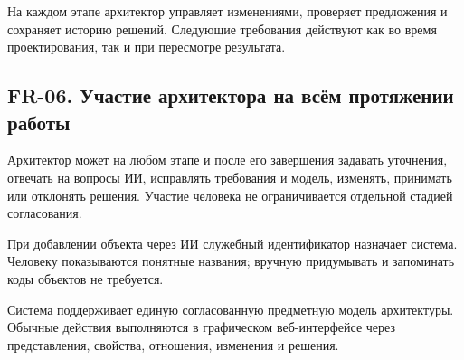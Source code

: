 \documentclass[10pt,a4paper]{article}
\begin{document}
На каждом этапе архитектор управляет изменениями, проверяет предложения и сохраняет историю решений. Следующие требования действуют как во время проектирования, так и при пересмотре результата.

\subsection{FR-06. Участие архитектора на всём протяжении работы}\label{fr-06-ux443ux447ux430ux441ux442ux438ux435-ux430ux440ux445ux438ux442ux435ux43aux442ux43eux440ux430-ux43dux430-ux432ux441ux451ux43c-ux43fux440ux43eux442ux44fux436ux435ux43dux438ux438-ux440ux430ux431ux43eux442ux44b}

Архитектор может на любом этапе и после его завершения задавать уточнения, отвечать на вопросы ИИ, исправлять требования и модель, изменять, принимать или отклонять решения. Участие человека не ограничивается отдельной стадией согласования.

При добавлении объекта через ИИ служебный идентификатор назначает система. Человеку показываются понятные названия; вручную придумывать и запоминать коды объектов не требуется.

Система поддерживает единую согласованную предметную модель архитектуры. Обычные действия выполняются в графическом веб-интерфейсе через представления, свойства, отношения, изменения и решения.

\end{document}
